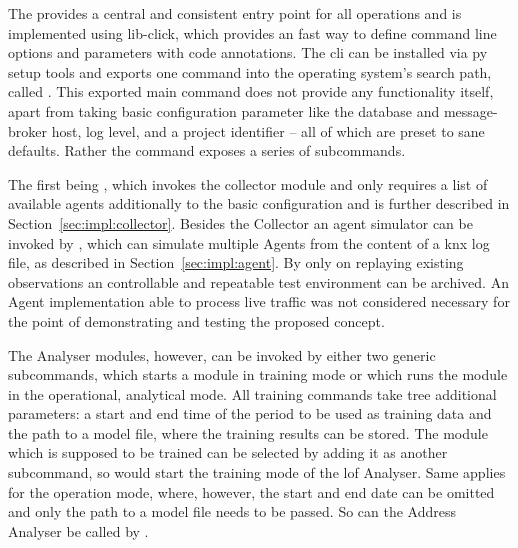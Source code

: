 \begin{comment}
\begin{itemize}
	\item central entry point for all operations
	\item consistent user experience -> less fiddling while debugging/developing
	\item centralises configuration and log setup
	\item can be easily made accessible via python setuptools
		\subitem if globally installed, callable via normal terminal command
	\item implemented using the \gls{lib-click} library version 6
\end{itemize}
\end{comment}

The  provides a central and consistent entry point for all operations and is implemented using \gls{lib-click}, which provides an fast way to define command line options and parameters with code annotations.
The \gls{cli} can be installed via \gls{py} setup tools and exports one command into the operating system's search path, called .
This exported main command does not provide any functionality itself, apart from taking basic configuration parameter like the database and message-broker host, log level, and a project identifier -- all of which are preset to sane defaults.
Rather the command exposes a series of subcommands.

The first being , which invokes the collector module and only requires a list of available agents additionally to the basic configuration and is further described in Section~\ref{sec:impl:collector}.
Besides the Collector an agent simulator can be invoked by , which can simulate multiple Agents from the content of a \gls{knx} log file, as described in Section~\ref{sec:impl:agent}.
By only on replaying existing observations an controllable and repeatable test environment can be archived. An Agent implementation able to process live traffic was not considered necessary for the point of demonstrating and testing the proposed concept.

The Analyser modules, however, can be invoked by either two generic subcommands,  which starts a module in training mode or  which runs the module in the operational, analytical mode.
All training commands take tree additional parameters: a start and end time of the period to be used as training data and the path to a model file, where the training results can be stored. The module which is supposed to be trained can be selected by adding it as another subcommand, so would  start the training mode of the \gls{lof} Analyser.
Same applies for the operation mode, where, however, the start and end date can be omitted and only the path to a model file needs to be passed. So can the Address Analyser be called by .


